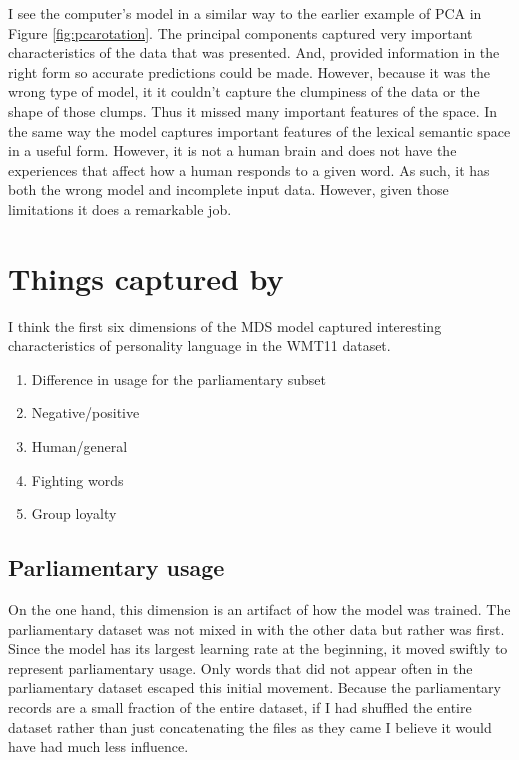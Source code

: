 \documentclass[eric_thesis.tex]{subfiles}
\begin{document}
I see the computer's model in a similar way to the earlier example of PCA in 
Figure \ref{fig:pcarotation}. The principal components captured very important
characteristics of the data that was presented. And, provided information in 
the right 
form so accurate predictions could be made. However, because it was the wrong
type of model, it it couldn't capture the clumpiness of the data or the 
shape of those clumps. Thus it missed many important features of the space. In 
the same way
the \modelname{} model captures important features of the lexical semantic space
in a useful form. However, it is not a human brain and does not have the 
experiences that affect how a human responds to a given word. As such, it has
both the wrong model and incomplete input data. However, given those limitations
it does a remarkable job.

\section{Things captured by \modelname{}}

I think the first six dimensions of the MDS \modelname{} model captured
 interesting characteristics of personality language in the WMT11 dataset.
%
\begin{enumerate}
 \item Difference in usage for the parliamentary subset
 \item Negative/positive
 \item Human/general
 \item Fighting words
 \item Group loyalty
\end{enumerate}

\subsection{Parliamentary usage}

On the one hand, this dimension is an artifact of how the model was trained.
The parliamentary dataset was not mixed in with the other data but rather was
first. Since the model has its largest learning rate at the beginning, it moved
swiftly to represent parliamentary usage. Only words that did not appear often
in the parliamentary dataset escaped this initial movement. Because the 
parliamentary records are a small fraction of the entire dataset, if I had 
shuffled the entire dataset rather than just concatenating the files as they 
came I believe it would have had much less influence.
\end{document}
